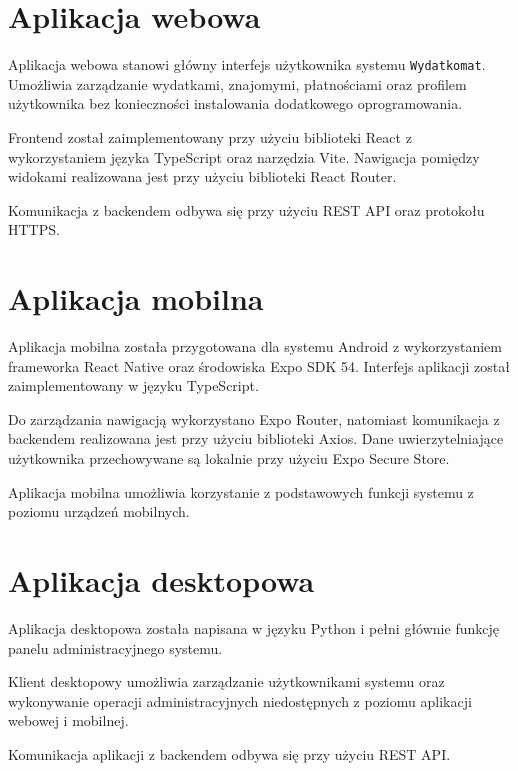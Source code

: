 \section{Aplikacja webowa}

Aplikacja webowa stanowi główny interfejs użytkownika systemu \verb|Wydatkomat|. Umożliwia zarządzanie wydatkami, znajomymi, płatnościami oraz profilem użytkownika bez konieczności instalowania dodatkowego oprogramowania.

Frontend został zaimplementowany przy użyciu biblioteki React z wykorzystaniem języka TypeScript oraz narzędzia Vite. Nawigacja pomiędzy widokami realizowana jest przy użyciu biblioteki React Router.

Komunikacja z backendem odbywa się przy użyciu REST API oraz protokołu HTTPS.

\section{Aplikacja mobilna}

Aplikacja mobilna została przygotowana dla systemu Android z wykorzystaniem frameworka React Native oraz środowiska Expo SDK 54. Interfejs aplikacji został zaimplementowany w języku TypeScript.

Do zarządzania nawigacją wykorzystano Expo Router, natomiast komunikacja z backendem realizowana jest przy użyciu biblioteki Axios. Dane uwierzytelniające użytkownika przechowywane są lokalnie przy użyciu Expo Secure Store.

Aplikacja mobilna umożliwia korzystanie z podstawowych funkcji systemu z poziomu urządzeń mobilnych.

\section{Aplikacja desktopowa}

Aplikacja desktopowa została napisana w języku Python i pełni głównie funkcję panelu administracyjnego systemu.

Klient desktopowy umożliwia zarządzanie użytkownikami systemu oraz wykonywanie operacji administracyjnych niedostępnych z poziomu aplikacji webowej i mobilnej.

Komunikacja aplikacji z backendem odbywa się przy użyciu REST API.